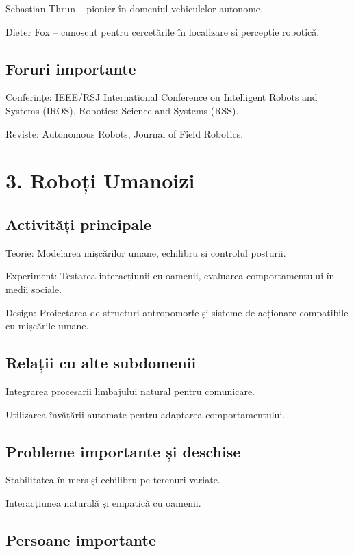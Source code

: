\documentclass[12pt]{article}
\begin{document}
Sebastian Thrun – pionier în domeniul vehiculelor autonome.

Dieter Fox – cunoscut pentru cercetările în localizare și percepție robotică.

\subsection*{Foruri importante}

Conferințe: IEEE/RSJ International Conference on Intelligent Robots and Systems (IROS), Robotics: Science and Systems (RSS).

Reviste: Autonomous Robots, Journal of Field Robotics.

\section{3. Roboți Umanoizi}

\subsection*{Activități principale}

Teorie: Modelarea mișcărilor umane, echilibru și controlul posturii.

Experiment: Testarea interacțiunii cu oamenii, evaluarea comportamentului în medii sociale.

Design: Proiectarea de structuri antropomorfe și sisteme de acționare compatibile cu mișcările umane.

\subsection*{Relații cu alte subdomenii}

Integrarea procesării limbajului natural pentru comunicare.

Utilizarea învățării automate pentru adaptarea comportamentului.

\subsection*{Probleme importante și deschise}

Stabilitatea în mers și echilibru pe terenuri variate.

Interacțiunea naturală și empatică cu oamenii.

\subsection*{Persoane importante}
\end{document}
